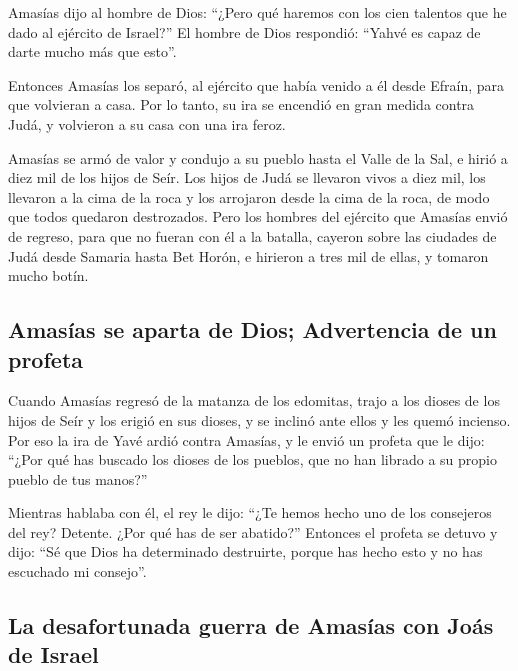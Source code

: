  Amasías dijo al hombre de Dios: ``¿Pero qué haremos con
los cien talentos que he dado al ejército de Israel?'' El hombre de Dios
respondió: ``Yahvé es capaz de darte mucho más que esto''.

 Entonces Amasías los separó, al ejército que había
venido a él desde Efraín, para que volvieran a casa. Por lo tanto, su
ira se encendió en gran medida contra Judá, y volvieron a su casa con
una ira feroz.

 Amasías se armó de valor y condujo a su pueblo hasta el
Valle de la Sal, e hirió a diez mil de los hijos de Seír.
 Los hijos de Judá se llevaron vivos a diez mil, los
llevaron a la cima de la roca y los arrojaron desde la cima de la roca,
de modo que todos quedaron destrozados.  Pero los hombres
del ejército que Amasías envió de regreso, para que no fueran con él a
la batalla, cayeron sobre las ciudades de Judá desde Samaria hasta Bet
Horón, e hirieron a tres mil de ellas, y tomaron mucho botín.

\hypertarget{amasuxedas-se-aparta-de-dios-advertencia-de-un-profeta}{%
\subsection{Amasías se aparta de Dios; Advertencia de un
profeta}\label{amasuxedas-se-aparta-de-dios-advertencia-de-un-profeta}}

 Cuando Amasías regresó de la matanza de los edomitas,
trajo a los dioses de los hijos de Seír y los erigió en sus dioses, y se
inclinó ante ellos y les quemó incienso.  Por eso la ira
de Yavé ardió contra Amasías, y le envió un profeta que le dijo: ``¿Por
qué has buscado los dioses de los pueblos, que no han librado a su
propio pueblo de tus manos?''

 Mientras hablaba con él, el rey le dijo: ``¿Te hemos
hecho uno de los consejeros del rey? Detente. ¿Por qué has de ser
abatido?'' Entonces el profeta se detuvo y dijo: ``Sé que Dios ha
determinado destruirte, porque has hecho esto y no has escuchado mi
consejo''.

\hypertarget{la-desafortunada-guerra-de-amasuxedas-con-jouxe1s-de-israel}{%
\subsection{La desafortunada guerra de Amasías con Joás de
Israel}\label{la-desafortunada-guerra-de-amasuxedas-con-jouxe1s-de-israel}}

